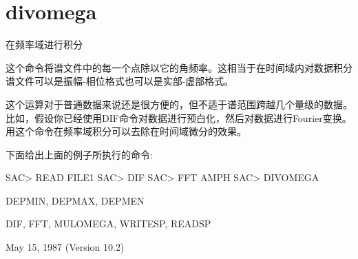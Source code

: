 \section{divomega}
\label{cmd:divomega}

在频率域进行积分

这个命令将谱文件中的每一个点除以它的角频率。这相当于在时间域内对数据积分谱文件可以是振幅-相位格式也可以是实部-虚部格式。

这个运算对于普通数据来说还是很方便的，但不适于谱范围跨越几个量级的数据。比如，假设你已经使用DIF命令对数据进行预白化，然后对数据进行Fourier变换。用这个命令在频率域积分可以去除在时间域微分的效果。

下面给出上面的例子所执行的命令:
\begin{SACCode}
SAC> READ FILE1
SAC> DIF
SAC> FFT AMPH
SAC> DIVOMEGA
\end{SACCode}

DEPMIN, DEPMAX, DEPMEN

DIF, FFT, MULOMEGA, WRITESP, READSP

May 15, 1987 (Version 10.2)
